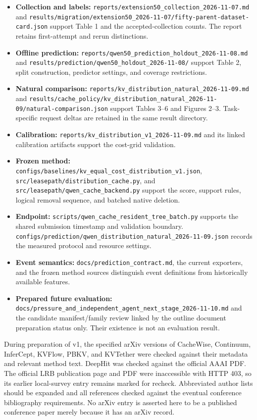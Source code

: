 \documentclass[
  english,
  10pt,
]{article}
\providecommand{\tightlist}{%
  \setlength{\itemsep}{0pt}\setlength{\parskip}{0pt}}
\begin{document}
\begin{itemize}
\tightlist
\item
  \textbf{Collection and labels:}
  \nolinkurl{reports/extension50_collection_2026-11-07.md} and
  \nolinkurl{results/migration/extension50_2026-11-07/fifty-parent-dataset-card.json}
  support Table 1 and the accepted-collection counts. The report retains
  first-attempt and rerun distinctions.
\item
  \textbf{Offline prediction:}
  \nolinkurl{reports/qwen50_prediction_holdout_2026-11-08.md} and
  \nolinkurl{results/prediction/qwen50_holdout_2026-11-08/} support
  Table 2, split construction, predictor settings, and coverage
  restrictions.
\item
  \textbf{Natural comparison:}
  \nolinkurl{reports/kv_distribution_natural_2026-11-09.md} and
  \nolinkurl{results/cache_policy/kv_distribution_natural_2026-11-09/natural-comparison.json}
  support Tables 3--6 and Figures 2--3. Task-specific request deltas are
  retained in the same result directory.
\item
  \textbf{Calibration:}
  \nolinkurl{reports/kv_distribution_v1_2026-11-09.md} and its linked
  calibration artifacts support the cost-grid validation.
\item
  \textbf{Frozen method:}
  \nolinkurl{configs/baselines/kv_equal_cost_distribution_v1.json},
  \nolinkurl{src/leasepath/distribution_cache.py}, and
  \nolinkurl{src/leasepath/qwen_cache_backend.py} support the score,
  support rules, logical removal sequence, and batched native deletion.
\item
  \textbf{Endpoint:}
  \nolinkurl{scripts/qwen_cache_resident_tree_batch.py} supports the
  shared submission timestamp and validation boundary.
  \nolinkurl{configs/prediction/qwen_distribution_natural_2026-11-09.json}
  records the measured protocol and resource settings.
\item
  \textbf{Event semantics:} \nolinkurl{docs/prediction_contract.md}, the
  current exporters, and the frozen method sources distinguish event
  definitions from historically available features.
\item
  \textbf{Prepared future evaluation:}
  \nolinkurl{docs/pressure_and_independent_agent_next_stage_2026-11-10.md}
  and the candidate manifest/family review linked by the outline
  document preparation status only. Their existence is not an evaluation
  result.
\end{itemize}

During preparation of v1, the specified arXiv versions of CacheWise,
Continuum, InferCept, KVFlow, PBKV, and KVTether were checked against
their metadata and relevant method text. DeepHit was checked against the
official AAAI PDF. The official LRB publication page and PDF were
inaccessible with HTTP 403, so its earlier local-survey entry remains
marked for recheck. Abbreviated author lists should be expanded and all
references checked against the eventual conference bibliography
requirements. No arXiv entry is asserted here to be a published
conference paper merely because it has an arXiv record.
\end{document}
